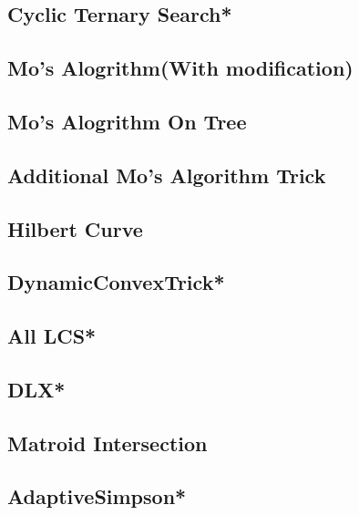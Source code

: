 \subsection{Cyclic Ternary Search*} %

\subsection{Mo's Alogrithm(With modification)}

\subsection{Mo's Alogrithm On Tree}

\subsection{Additional Mo's Algorithm Trick}

\subsection{Hilbert Curve}

\subsection{DynamicConvexTrick*} %

%
\subsection{All LCS*} %

\subsection{DLX*} %

\subsection{Matroid Intersection}

\subsection{AdaptiveSimpson*} %

